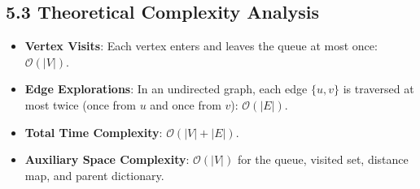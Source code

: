 \documentclass[12pt]{article}
\begin{document}
\subsection*{5.3 Theoretical Complexity Analysis}
\begin{itemize}
    \item \textbf{Vertex Visits}: Each vertex enters and leaves the queue at most once: $\mathcal{O}(|V|)$.
    \item \textbf{Edge Explorations}: In an undirected graph, each edge $\{u, v\}$ is traversed at most twice (once from $u$ and once from $v$): $\mathcal{O}(|E|)$.
    \item \textbf{Total Time Complexity}: $\mathcal{O}(|V| + |E|)$.
    \item \textbf{Auxiliary Space Complexity}: $\mathcal{O}(|V|)$ for the queue, visited set, distance map, and parent dictionary.
\end{itemize}
\end{document}
